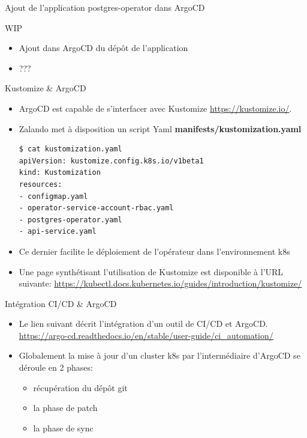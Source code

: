 
\begin{frame}[fragile]{Ajout de l'application postgres-operator dans ArgoCD}

   WIP

\begin{itemize}
   \item Ajout dans ArgoCD du dépôt de l'application
   \item ???
\end{itemize}

\end{frame}


\begin{frame}[fragile]{Kustomize \& ArgoCD}

\begin{itemize}
   \item ArgoCD est capable de s'interfacer avec Kustomize \url{https://kustomize.io/}.
   \item Zalando met à disposition un script Yaml \textbf{manifests/kustomization.yaml}
\begin{tiny}
\begin{Verbatim}[commandchars=\&\@\@]
$ cat kustomization.yaml 
apiVersion: kustomize.config.k8s.io/v1beta1
kind: Kustomization
resources:
- configmap.yaml
- operator-service-account-rbac.yaml
- postgres-operator.yaml
- api-service.yaml
\end{Verbatim}
\end{tiny}
   \item Ce dernier facilite le déploiement de l'opérateur dans l'environnement k8s
   \item Une page synthétisant l'utilisation de Kustomize est disponible à l'URL suivante: \url{https://kubectl.docs.kubernetes.io/guides/introduction/kustomize/}
\end{itemize}

\end{frame}


\begin{frame}[fragile]{Intégration CI/CD \& ArgoCD}

\begin{itemize}
   \item Le lien suivant décrit l'intégration d'un outil de CI/CD et ArgoCD. \url{https://argo-cd.readthedocs.io/en/stable/user-guide/ci_automation/}
   \item Globalement la mise à jour d'un cluster k8s par l'intermédiaire d'ArgoCD se déroule en 2 phases:
   \begin{itemize}
      \item récupération du dépôt git
      \item la phase de patch
      \item la phase de sync
   \end{itemize}
\end{itemize}

\end{frame}

